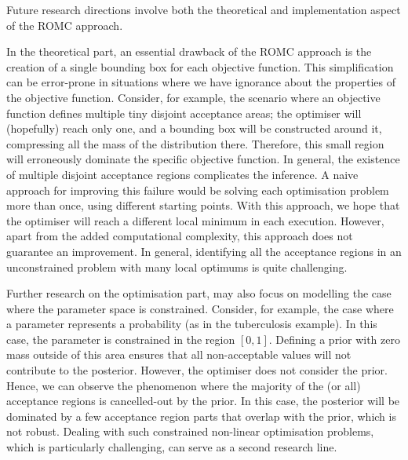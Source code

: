 Future research directions involve both the theoretical and
implementation aspect of the ROMC approach.


In the theoretical part, an essential drawback of the ROMC approach is
the creation of a single bounding box for each objective
function. This simplification can be error-prone in situations where
we have ignorance about the properties of the objective
function. Consider, for example, the scenario where an objective
function defines multiple tiny disjoint acceptance areas; the
optimiser will (hopefully) reach only one, and a bounding box will be
constructed around it, compressing all the mass of the distribution
there. Therefore, this small region will erroneously dominate the
specific objective function. In general, the existence of multiple
disjoint acceptance regions complicates the inference. A naive
approach for improving this failure would be solving each optimisation
problem more than once, using different starting points. With this
approach, we hope that the optimiser will reach a different local
minimum in each execution. However, apart from the added computational
complexity, this approach does not guarantee an improvement. In
general, identifying all the acceptance regions in an unconstrained
problem with many local optimums is quite challenging.


Further research on the optimisation part, may also focus on modelling
the case where the parameter space is constrained. Consider, for
example, the case where a parameter represents a probability (as in
the tuberculosis example). In this case, the parameter is constrained
in the region $[0,1]$. Defining a prior with zero mass outside of this
area ensures that all non-acceptable values will not contribute to the
posterior. However, the optimiser does not consider the prior. Hence,
we can observe the phenomenon where the majority of the (or all)
acceptance regions is cancelled-out by the prior. In this case, the
posterior will be dominated by a few acceptance region parts that
overlap with the prior, which is not robust. Dealing with such
constrained non-linear optimisation problems, which is particularly
challenging, can serve as a second research line.


